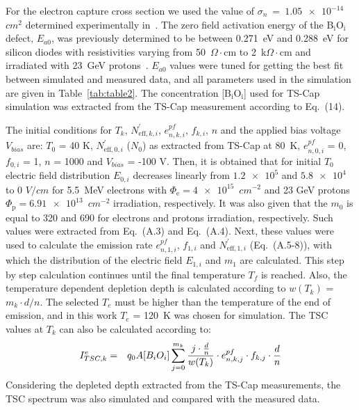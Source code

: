 \documentclass[final, 5p, times]{elsarticle}
\begin{document}
\par
For the electron capture cross section we used the value of $\sigma_n$~=~$\num{1.05e-14}$~$\si{cm^2}$ determined experimentally in~\cite{b33}. The zero field activation energy of the B$_\text{i}$O$_\text{i}$ defect, $E_{a0}$, was previously determined to be between 0.271~eV and 0.288~eV for silicon diodes with resistivities varying from 50~$\Omega\cdot$cm to 2~k$\Omega\cdot$cm and irradiated with 23~GeV protons~\cite{b27}. $E_{a0}$ values were tuned for getting the best fit between simulated and measured data, and all parameters used in the simulation are given in Table~\ref{tab:table2}. The concentration [B$_\text{i}$O$_\text{i}$] used for TS-Cap simulation was extracted
from the TS-Cap measurement according to Eq.~(14). 
\par
The initial conditions for $T_k$, $N^{'}_{\text{eff},k,i}$, $e^{pf}_{n,k,i}$, $f_{k,i}$, $n$ and the applied bias voltage $V_{bias}$ are: $T_0$ = 40 K, $N^{'}_{\text{eff},0,i}$ ($N_0$) as extracted from TS-Cap at 80~K, $e^{pf}_{n,0,i}$ = 0, $f_{0,i}$ = 1, $n$ = 1000 and $V_{bias}$ = -100 V. Then, it is obtained that for initial $T_0$ electric field distribution $E_{0,i}$ decreases linearly from $\num{1.2e5}$ and $\num{5.8e4}$ to 0 $\si{V/cm}$ for 5.5~MeV electrons with $\Phi_\text{e} = \num{4e15}$~$\si{cm^{-2}}$ and 23 GeV protons $\Phi_\text{p} = \num{6.91e13}$~$\si{cm^{-2}}$ irradiation, respectively. It was also given that the $m_0$ is equal to 320 and 690 for electrons and protons irradiation, respectively. Such values were extracted from Eq.~(A.3) and Eq.~(A.4). Next, these values were used to calculate the emission rate $e^{pf}_{n,1,i}$, $f_{1,i}$ and $N^{'}_{\text{eff},1,i}$ (Eq.~(A.5-8)), with which the distribution of the electric field $E_{1,i}$ and $m_1$ are calculated. This step by step calculation continues until the final temperature $T_f$ is reached. Also, the temperature dependent depletion depth is calculated according to $w(T_k)$ = $m_k \cdot d/n$. The selected $T_e$ must be higher than the temperature of the end of emission, and in this work $T_e$ = 120~K was chosen for simulation. The TSC values at $T_k$ can also be calculated according to:
\begin{eqnarray} 
I^{e}_{TSC, k}  & = & q_0 A [B_i O_i] \sum_{j=0}^{m_k} {{j \cdot {d \over n}} \over {w(T_k)}} \cdot e^{pf}_{n,k,j}  \cdot  f_{k,j} \cdot {d \over n}
\end{eqnarray}
Considering the depleted depth extracted from the TS-Cap measurements, the TSC spectrum was also simulated and compared with the measured data. 
\end{document}
